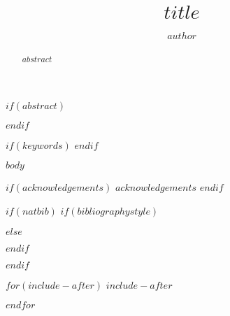\documentclass[times]{simauth}
\begin{document}

\title{$title$}
\author{$author$}
\address{$for(address)$ $address.address$\\$endfor$}

$if(abstract)$
\begin{abstract}
$abstract$
\end{abstract}
$endif$

$if(keywords)$
$endif$

\maketitle

$body$

$if(acknowledgements)$
\acks $acknowledgements$
$endif$

$if(natbib)$
$if(bibliographystyle)$

$else$

$endif$

$endif$

$for(include-after)$
$include-after$

$endfor$
\end{document}
